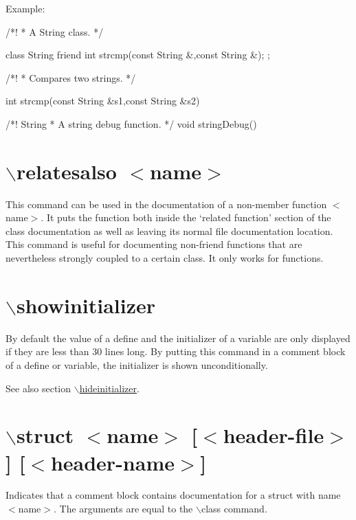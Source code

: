 \begin{DoxyParagraph}{Example:}

\begin{DoxyVerbInclude}
/*! 
 * A String class.
 */ 
  
class String
{
  friend int strcmp(const String &,const String &);
};

/*! 
 * Compares two strings.
 */

int strcmp(const String &s1,const String &s2)
{
}

/*! \relates String
 * A string debug function.
 */
void stringDebug()
{
}
\end{DoxyVerbInclude}
 
\end{DoxyParagraph}


 \hypertarget{commands_cmdrelatesalso}{}\section{$\backslash$relatesalso $<$name$>$}\label{commands_cmdrelatesalso}
 This command can be used in the documentation of a non-\/member function $<$name$>$. It puts the function both inside the `related function' section of the class documentation as well as leaving its normal file documentation location. This command is useful for documenting non-\/friend functions that are nevertheless strongly coupled to a certain class. It only works for functions.



 \hypertarget{commands_cmdshowinitializer}{}\section{$\backslash$showinitializer}\label{commands_cmdshowinitializer}
 By default the value of a define and the initializer of a variable are only displayed if they are less than 30 lines long. By putting this command in a comment block of a define or variable, the initializer is shown unconditionally.

\begin{DoxySeeAlso}{See also}
section \hyperlink{commands_cmdhideinitializer}{$\backslash$hideinitializer}.
\end{DoxySeeAlso}


 \hypertarget{commands_cmdstruct}{}\section{$\backslash$struct $<$name$>$ \mbox{[}$<$header-\/file$>$\mbox{]} \mbox{[}$<$header-\/name$>$\mbox{]}}\label{commands_cmdstruct}
 Indicates that a comment block contains documentation for a struct with name $<$name$>$. The arguments are equal to the $\backslash$class command.

